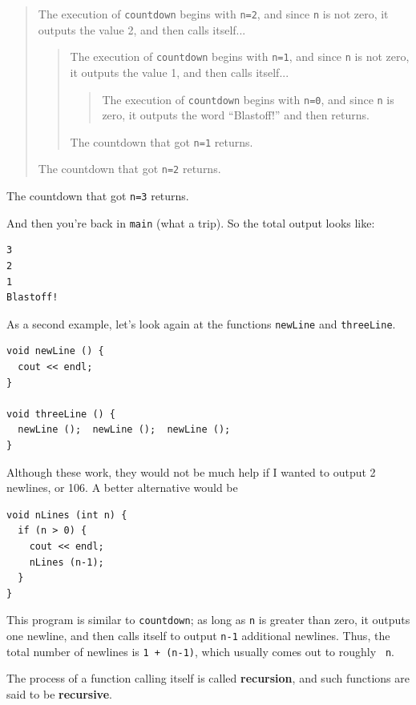 \begin{quote}
The execution of {\tt countdown} begins with {\tt n=2}, and
since {\tt n} is not zero, it outputs the value 2, and then
calls itself...

\begin{quote}
The execution of {\tt countdown} begins with {\tt n=1}, and
since {\tt n} is not zero, it outputs the value 1, and then
calls itself...

\begin{quote}
The execution of {\tt countdown} begins with {\tt n=0}, and
since {\tt n} is zero, it outputs the word ``Blastoff!''
and then returns.
\end{quote}

The countdown that got {\tt n=1} returns.

\end{quote}

The countdown that got {\tt n=2} returns.

\end{quote}

The countdown that got {\tt n=3} returns.

\noindent And then you're back in {\tt main} (what a trip).  So the
total output looks like:

\begin{verbatim}
3
2
1
Blastoff!
\end{verbatim}
%
As a second example, let's look again at the functions
{\tt newLine} and {\tt threeLine}.

\begin{verbatim}
void newLine () {
  cout << endl;
}

void threeLine () {
  newLine ();  newLine ();  newLine ();
}
\end{verbatim}
%
Although these work, they would not be much help if I wanted
to output 2 newlines, or 106.  A better alternative would be

\begin{verbatim}
void nLines (int n) {
  if (n > 0) {
    cout << endl;
    nLines (n-1);
  }
}
\end{verbatim}
%
This program is similar to {\tt countdown}; as long as {\tt n} is
greater than zero, it outputs one newline, and then calls itself to
output {\tt n-1} additional newlines.  Thus, the total number of
newlines is {\tt 1 + (n-1)}, which usually comes out to roughly {\tt
n}.


The process of a function calling itself is called {\bf recursion}, and
such functions are said to be {\bf recursive}.

